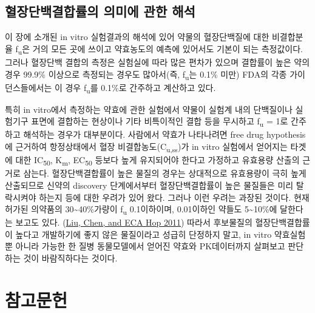 \documentclass[
  11pt,
  krantz2, a4paper, twoside]{krantz}
\begin{document}
\hypertarget{uxd608uxc7a5uxb2e8uxbc31uxacb0uxd569uxb960uxc758-uxc758uxbbf8uxc5d0-uxad00uxd55c-uxd574uxc11d}{%
\section{혈장단백결합률의 의미에 관한 해석}\label{uxd608uxc7a5uxb2e8uxbc31uxacb0uxd569uxb960uxc758-uxc758uxbbf8uxc5d0-uxad00uxd55c-uxd574uxc11d}}

이 장에 소개된 in vitro 실험결과의 해석에 있어 약물의 혈장단백질에 대한
비결합분율 f\textsubscript{u}은 거의 모든 곳에 쓰이고 약효농도의 예측에 있어서도
기본이 되는 측정값이다. 그러나 혈장단백 결합의 측정은 실험실에 따라 많은
편차가 있으며 결합률이 높은 약의 경우 99.9\% 이상으로 측정되는 경우도 많아서(즉, f\textsubscript{u}는 0.1\% 미만) FDA의 각종 가이던스들에서는 이 경우
f\textsubscript{u}를 0.1\%로 간주하고 계산하고 있다.

특히 in vitro에서 측정하는 약효에 관한 실험에서 약물이 실험계 내의
단백질이나 실험기구 표면에 결합하는 현상이나 기타 비특이적인 결합 등을
무시하고 f\textsubscript{u} = 1로 간주하고 해석하는 경우가 대부분이다. 사람에서 약효가
나타나려면 free drug hypothesis에 근거하여 항정상태에서 혈장
비결합농도(C\textsubscript{u,ss})가 in vitro 실험에서 얻어지는 타겟에 대한 IC\textsubscript{50},
K\textsubscript{m}, EC\textsubscript{50} 등보다 높게 유지되어야 한다고 가정하고 유효용량 산출의
근거로 삼는다. 혈장단백결합률이 높은 물질의 경우는 상대적으로 유효용량이
극히 높게 산출되므로 신약의 discovery 단계에서부터 혈장단백결합률이 높은
물질들은 미리 탈락시켜야 하는지 등에 대한 우려가 있어 왔다. 그러나 이런
우려는 과장된 것이다. 현재 허가된 의약품의 30\textasciitilde40\%가량이 f\textsubscript{u} 0.1이하이며,
0.01이하인 약들도 5\textasciitilde10\%에 달한다는 보고도 있다. (\protect\hyperlink{ref-liu2011we}{Liu, Chen, and ECA Hop 2011})
따라서 후보물질의 혈장단백결합률이 높다고 개발하기에 좋지 않은
물질이라고 성급히 단정하지 말고, in vitro 약효실험 뿐 아니라 가능한 한
질병 동물모델에서 얻어진 약효와 PK데이터까지 살펴보고 판단하는 것이
바람직하다는 것이다.

\backmatter

\hypertarget{uxcc38uxace0uxbb38uxd5cc}{%
\chapter*{참고문헌}\label{uxcc38uxace0uxbb38uxd5cc}}
\end{document}
